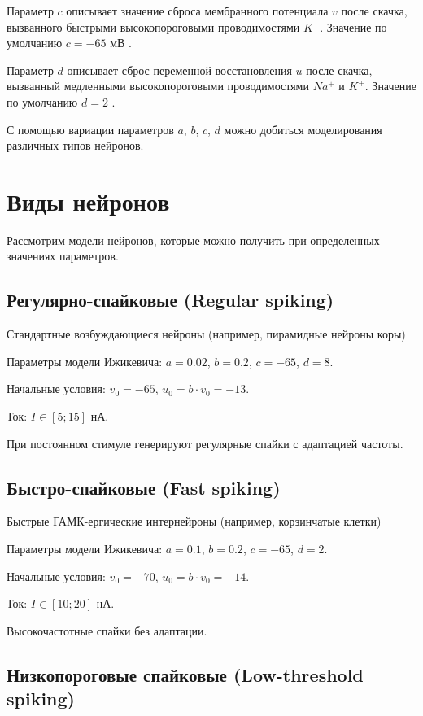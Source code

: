 Параметр $c$ описывает значение сброса мембранного потенциала $v$ после скачка, вызванного быстрыми высокопороговыми проводимостями $K^+$. Значение по умолчанию $c=-65$ мВ \cite{dhamo2021efficient}.

Параметр $d$ описывает сброс переменной восстановления $u$ после скачка, вызванный медленными высокопороговыми проводимостями $Na^+$ и $K^+$. Значение по умолчанию $d=2$ \cite{dhamo2021efficient}. 

С помощью вариации параметров $a$, $b$, $c$, $d$ можно добиться моделирования различных типов нейронов.



\section{Виды нейронов}

Рассмотрим модели нейронов, которые можно получить при определенных значениях параметров.

\subsection{Регулярно-спайковые (Regular spiking)}

Стандартные возбуждающиеся нейроны (например, пирамидные нейроны коры)

Параметры модели Ижикевича: $a=0.02$, $b=0.2$, $c = -65$, $d = 8$. 

Начальные условия: $v_0 = -65$, $u_0 = b \cdot v_0 = -13$. 

Ток: $I \in [5; 15]$ нА.

При постоянном стимуле генерируют регулярные спайки с адаптацией частоты.

\subsection{Быстро-спайковые (Fast spiking)}

Быстрые ГАМК-ергические интернейроны (например, корзинчатые клетки)


Параметры модели Ижикевича: $a=0.1$, $b=0.2$, $c = -65$, $d = 2$.

Начальные условия: $v_0 = -70$, $u_0 = b \cdot v_0 = -14$. 

Ток: $I \in [10; 20]$ нА.

Высокочастотные спайки без адаптации.


\subsection{Низкопороговые спайковые (Low-threshold spiking)}

